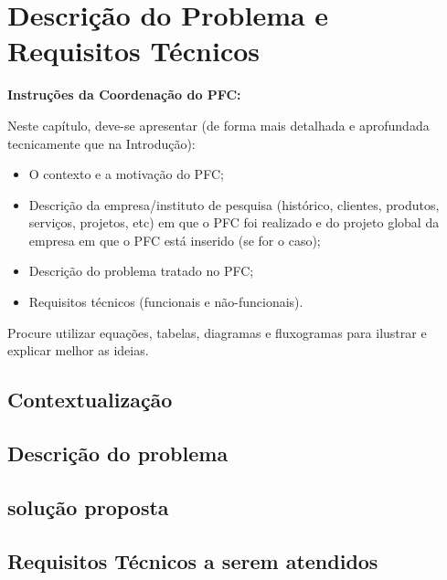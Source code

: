 \chapter{Descrição do Problema e Requisitos Técnicos}

\textbf{Instruções da Coordenação do PFC:}

Neste capítulo, deve-se apresentar (de forma mais detalhada e aprofundada tecnicamente que na Introdução):
\begin{itemize}
	\item O contexto e a motivação do PFC;
	\item Descrição da empresa/instituto de pesquisa (histórico, clientes, produtos, serviços, projetos, etc) em que o PFC foi realizado e do projeto global da empresa em que o PFC está inserido (se for o caso);
     \item Descrição do problema tratado no PFC;
     \item Requisitos técnicos (funcionais e não-funcionais).
\end{itemize}

Procure utilizar equações, tabelas, diagramas e fluxogramas para ilustrar e explicar melhor as ideias.


\section{Contextualização}
\section{Descrição do problema}
\section{solução proposta}
\section{Requisitos Técnicos a serem atendidos}
